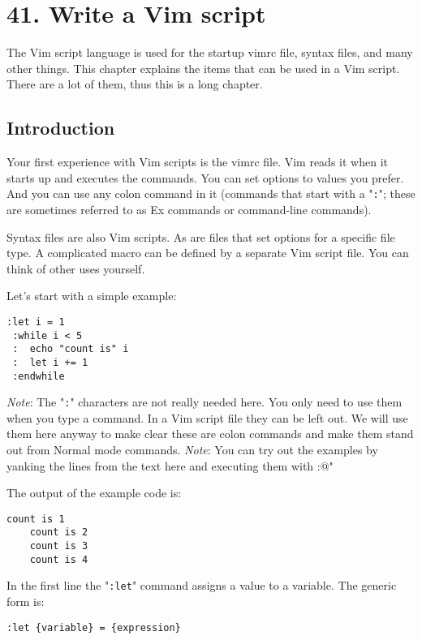 \section{41. Write a Vim script}
\label{Write a Vim script}
The Vim script language is used for the startup vimrc file, syntax files, and many other things.
This chapter explains the items that can be used in a Vim script.
There are a lot of them, thus this is a long chapter.
\subsection{Introduction}
\label{vim-script-intro}
\label{script}
Your first experience with Vim scripts is the vimrc file.
Vim reads it when it starts up and executes the commands.
You can set options to values you prefer.
And you can use any colon command in it (commands that start with a "\verb!:!"; these are sometimes referred to as Ex commands or command-line commands).

Syntax files are also Vim scripts.
As are files that set options for a specific file type.
A complicated macro can be defined by a separate Vim script file.
You can think of other uses yourself.

Let's start with a simple example:

\begin{Verbatim}[samepage=true]
 :let i = 1
 :while i < 5
 :  echo "count is" i
 :  let i += 1
 :endwhile
\end{Verbatim}

\emph{Note}: The "\verb!:!" characters are not really needed here.
You only need to use them when you type a command.
In a Vim script file they can be left out.
We will use them here anyway to make clear these are colon commands and make them stand out from Normal mode commands.
\emph{Note}: You can try out the examples by yanking the lines from the text here and executing them with :@"

The output of the example code is:

\begin{Verbatim}[samepage=true]
    count is 1
    count is 2
    count is 3
    count is 4
\end{Verbatim}

In the first line the "\verb!:let!" command assigns a value to a variable.
The generic form is:

\begin{Verbatim}[samepage=true]
 :let {variable} = {expression}
\end{Verbatim}

